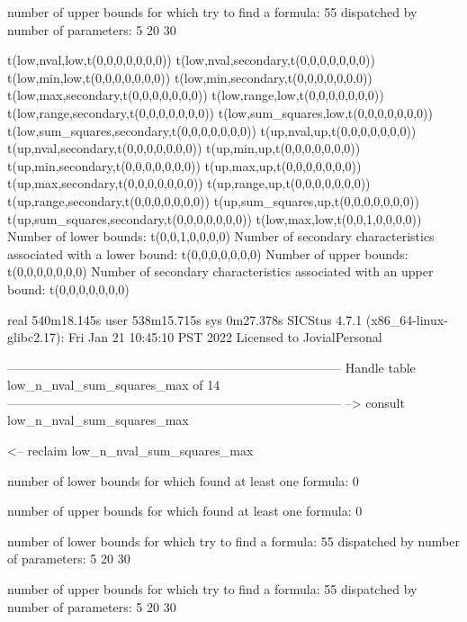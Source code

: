 number of upper bounds for which try to find a formula: 55
dispatched by number of parameters: 5  20  30

t(low,nval,low,t(0,0,0,0,0,0,0))
t(low,nval,secondary,t(0,0,0,0,0,0,0))
t(low,min,low,t(0,0,0,0,0,0,0))
t(low,min,secondary,t(0,0,0,0,0,0,0))
t(low,max,secondary,t(0,0,0,0,0,0,0))
t(low,range,low,t(0,0,0,0,0,0,0))
t(low,range,secondary,t(0,0,0,0,0,0,0))
t(low,sum_squares,low,t(0,0,0,0,0,0,0))
t(low,sum_squares,secondary,t(0,0,0,0,0,0,0))
t(up,nval,up,t(0,0,0,0,0,0,0))
t(up,nval,secondary,t(0,0,0,0,0,0,0))
t(up,min,up,t(0,0,0,0,0,0,0))
t(up,min,secondary,t(0,0,0,0,0,0,0))
t(up,max,up,t(0,0,0,0,0,0,0))
t(up,max,secondary,t(0,0,0,0,0,0,0))
t(up,range,up,t(0,0,0,0,0,0,0))
t(up,range,secondary,t(0,0,0,0,0,0,0))
t(up,sum_squares,up,t(0,0,0,0,0,0,0))
t(up,sum_squares,secondary,t(0,0,0,0,0,0,0))
t(low,max,low,t(0,0,1,0,0,0,0))
Number of lower bounds:                                             t(0,0,1,0,0,0,0)
Number of secondary characteristics associated with a lower bound:  t(0,0,0,0,0,0,0)
Number of upper bounds:                                             t(0,0,0,0,0,0,0)
Number of secondary characteristics associated with an upper bound: t(0,0,0,0,0,0,0)

real	540m18.145s
user	538m15.715s
sys	0m27.378s
SICStus 4.7.1 (x86_64-linux-glibc2.17): Fri Jan 21 10:45:10 PST 2022
Licensed to JovialPersonal


--------------------------------------------------------------------------------
Handle table low_n_nval_sum_squares_max of 14
--------------------------------------------------------------------------------
--> consult low_n_nval_sum_squares_max

<-- reclaim low_n_nval_sum_squares_max

number of lower bounds for which found at least one formula: 0

number of upper bounds for which found at least one formula: 0

number of lower bounds for which try to find a formula: 55
dispatched by number of parameters: 5  20  30

number of upper bounds for which try to find a formula: 55
dispatched by number of parameters: 5  20  30

